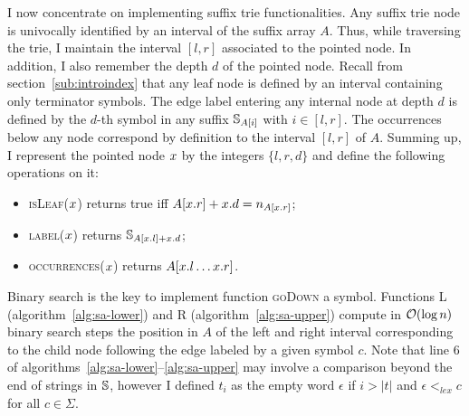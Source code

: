 I now concentrate on implementing suffix trie functionalities.
Any suffix trie node is univocally identified by an interval of the suffix array $A$.
Thus, while traversing the trie, I maintain the interval $[l,r]$ associated to the pointed node.
In addition, I also remember the depth $d$ of the pointed node.
Recall from section~\ref{sub:introindex} that any leaf node is defined by an interval containing only terminator symbols.
The edge label entering any internal node at depth $d$ is defined by the $d$-th symbol in any suffix $\mathbb {S}_{A[i]}$ with $i \in [l,r]$.
The occurrences below any node correspond by definition to the interval $[l,r]$ of $A$.
Summing up, I represent the pointed node $x$ by the integers $\{ l, r ,d \}$ and define the following operations on it:
\begin{itemize}
\item \textsc{isLeaf}($x$) returns true iff $A[x.r] + x.d = n_{A[x.r]}$;
\item \textsc{label}($x$) returns $\mathbb {S}_{A[x.l] + x.d}$;
\item \textsc{occurrences}($x$) returns $A[x.l \dots x.r]$.
\end{itemize}

Binary search is the key to implement function \textsc{goDown} a symbol.
Functions \textsc{L} (algorithm~\ref{alg:sa-lower}) and \textsc{R} (algorithm~\ref{alg:sa-upper}) compute in $\mathcal{O}(\log{n})$ binary search steps the position in $A$ of the left and right interval corresponding to the child node following the edge labeled by a given symbol $c$.
Note that line 6 of algorithms~\ref{alg:sa-lower}--\ref{alg:sa-upper} may involve a comparison beyond the end of strings in $\mathbb {S}$, however I defined $t_i$ as the empty word $\epsilon$ if $i > |t|$ and $\epsilon <_{lex} c$ for all $c \in \Sigma$.

